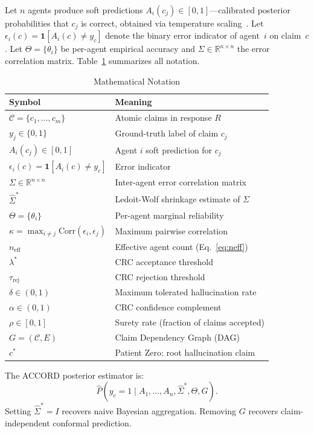 \documentclass[conference]{IEEEtran}
\begin{document}
Let $n$ agents produce soft predictions
$A_i(c_j) \in [0, 1]$—calibrated posterior probabilities that
$c_j$ is correct, obtained via temperature scaling~\cite{guo2017}.
Let $\epsilon_i(c) = \mathbf{1}[A_i(c) \neq y_c]$ denote
the binary error indicator of agent~$i$ on claim~$c$.
Let $\Theta = \{\theta_i\}$ be per-agent empirical accuracy and
$\Sigma \in \mathbb{R}^{n \times n}$ the error correlation matrix.
Table~\ref{tab:notation} summarizes all notation.

\begin{table}[t]
\caption{Mathematical Notation}
\label{tab:notation}
\centering
\begin{tabular}{ll}
\toprule
Symbol & Meaning \\
\midrule
$\mathcal{C} = \{c_1, \dots, c_m\}$ & Atomic claims in response $R$ \\
$y_j \in \{0,1\}$ & Ground-truth label of claim $c_j$ \\
$A_i(c_j) \in [0,1]$ & Agent $i$ soft prediction for $c_j$ \\
$\epsilon_i(c) = \mathbf{1}[A_i(c) \neq y_c]$ & Error indicator \\
$\Sigma \in \mathbb{R}^{n \times n}$ & Inter-agent error correlation matrix \\
$\hat{\Sigma}^*$ & Ledoit-Wolf shrinkage estimate of $\Sigma$ \\
$\Theta = \{\theta_i\}$ & Per-agent marginal reliability \\
$\kappa = \max_{i \neq j}\mathrm{Corr}(\epsilon_i,\epsilon_j)$ & Maximum pairwise correlation \\
$n_\text{eff}$ & Effective agent count (Eq.~\ref{eq:neff}) \\
$\lambda^*$ & CRC acceptance threshold \\
$\tau_\text{rej}$ & CRC rejection threshold \\
$\delta \in (0,1)$ & Maximum tolerated hallucination rate \\
$\alpha \in (0,1)$ & CRC confidence complement \\
$\rho \in [0,1]$ & Surety rate (fraction of claims accepted) \\
$G = (\mathcal{C}, E)$ & Claim Dependency Graph (DAG) \\
$c^*$ & Patient Zero: root hallucination claim \\
\bottomrule
\end{tabular}
\end{table}

The ACCORD posterior estimator is:
\begin{equation}
  \hat{P}(y_c = 1 \mid A_1, \ldots, A_n, \hat{\Sigma}^*, \Theta, G).
  \label{eq:estimator}
\end{equation}
Setting $\hat{\Sigma}^* = I$ recovers naive Bayesian aggregation.
Removing $G$ recovers claim-independent conformal prediction.
\end{document}
